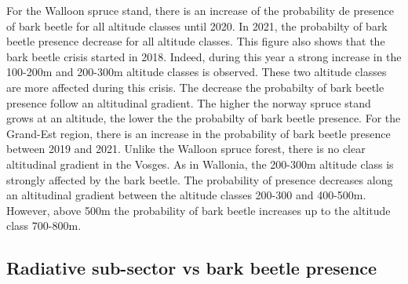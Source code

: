 \documentclass[3p,procedia]{elsarticle}
\begin{document}
For the Walloon spruce stand, there is an increase of the probability de presence of bark beetle for all altitude classes until 2020.
 In 2021, the probabilty of bark beetle presence decrease for all altitude classes.
This figure also shows that the bark beetle crisis started in 2018. Indeed, during this year a strong increase in the 100-200m and 200-300m altitude classes is observed. These two altitude classes are more affected during this crisis.  
The decrease the probabilty of bark beetle presence follow an altitudinal gradient. The higher the norway spruce stand grows at an altitude, the lower the the probabilty of bark beetle presence. For the Grand-Est region, there is an increase in the probability of bark beetle presence between 2019 and 2021. Unlike the Walloon spruce forest, there is no clear altitudinal gradient in the Vosges. As in Wallonia, the 200-300m altitude class is strongly affected by the bark beetle. The probability of presence decreases along an altitudinal gradient between the altitude classes 200-300 and 400-500m. However, above 500m the probability of bark beetle increases up to the altitude class 700-800m.


	




\subsection{Radiative sub-sector vs bark beetle presence}


 
\end{document}
